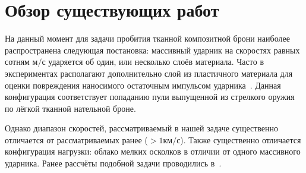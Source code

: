 \chapter{Обзор существующих работ}\label{ch:overview}

На данный момент для задачи пробития тканной композитной брони наиболее распространена следующая постановка:
массивный ударник на скоростях равных сотням $м/с$ ударяется об один, или несколько слоёв материала.
Часто в экспериментах располагают дополнительно слой из пластичного материала для оценки повреждения наносимого
остаточным импульсом ударника~\cite{kobylkin2014}.
Данная конфигурация соответствует попаданию пули выпущенной из стрелкого оружия по лёгкой тканной нательной броне.

Однако диапазон скоростей, рассматриваемый в нашей задаче существенно отличается от рассматриваемых ранее ($> 1 км/с$).
Также существенно отличается конфигурация нагрузки: облако мелких осколков в отличии от одного массивного ударника.
Ранее рассчёты подобной задачи проводились в~\cite{farenthold}.
